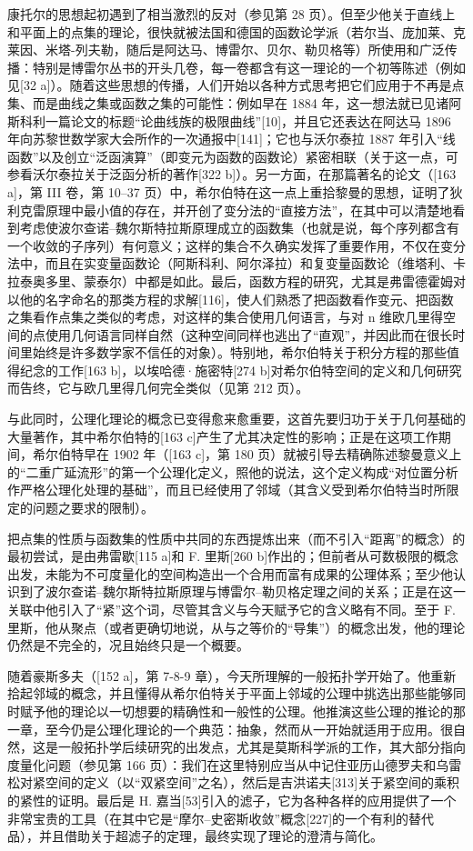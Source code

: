 康托尔的思想起初遇到了相当激烈的反对（参见第 28 页）。但至少他关于直线上和平面上的点集的理论，很快就被法国和德国的函数论学派（若尔当、庞加莱、克莱因、米塔-列夫勒，随后是阿达马、博雷尔、贝尔、勒贝格等）所使用和广泛传播：特别是博雷尔丛书的开头几卷，每一卷都含有这一理论的一个初等陈述（例如见{[}32 a{]}）。随着这些思想的传播，人们开始以各种方式思考把它们应用于不再是点集、而是曲线之集或函数之集的可能性：例如早在 1884 年，这一想法就已见诸阿斯科利一篇论文的标题“论曲线族的极限曲线”{[}10{]}，并且它还表达在阿达马 1896 年向苏黎世数学家大会所作的一次通报中{[}141{]}；它也与沃尔泰拉 1887 年引入“线函数”以及创立“泛函演算”（即变元为函数的函数论）紧密相联（关于这一点，可参看沃尔泰拉关于泛函分析的著作{[}322 b{]}）。另一方面，在那篇著名的论文（{[}163 a{]}，第 III 卷，第 10–37 页）中，希尔伯特在这一点上重拾黎曼的思想，证明了狄利克雷原理中最小值的存在，并开创了变分法的“直接方法”，在其中可以清楚地看到考虑使波尔查诺–魏尔斯特拉斯原理成立的函数集（也就是说，每个序列都含有一个收敛的子序列）有何意义；这样的集合不久确实发挥了重要作用，不仅在变分法中，而且在实变量函数论（阿斯科利、阿尔泽拉）和复变量函数论（维塔利、卡拉泰奥多里、蒙泰尔）中都是如此。最后，函数方程的研究，尤其是弗雷德霍姆对以他的名字命名的那类方程的求解{[}116{]}，使人们熟悉了把函数看作变元、把函数之集看作点集之类似的考虑，对这样的集合使用几何语言，与对 n 维欧几里得空间的点使用几何语言同样自然（这种空间同样也逃出了“直观”，并因此而在很长时间里始终是许多数学家不信任的对象）。特别地，希尔伯特关于积分方程的那些值得纪念的工作{[}163 b{]}，以埃哈德·施密特{[}274 b{]}对希尔伯特空间的定义和几何研究而告终，它与欧几里得几何完全类似（见第 212 页）。

与此同时，公理化理论的概念已变得愈来愈重要，这首先要归功于关于几何基础的大量著作，其中希尔伯特的{[}163 c{]}产生了尤其决定性的影响；正是在这项工作期间，希尔伯特早在 1902 年（{[}163 c{]}，第 180 页）就被引导去精确陈述黎曼意义上的“二重广延流形”的第一个公理化定义，照他的说法，这个定义构成“对位置分析作严格公理化处理的基础”，而且已经使用了邻域（其含义受到希尔伯特当时所限定的问题之要求的限制）。

把点集的性质与函数集的性质中共同的东西提炼出来（而不引入“距离”的概念）的最初尝试，是由弗雷歇{[}115 a{]}和 F. 里斯{[}260 b{]}作出的；但前者从可数极限的概念出发，未能为不可度量化的空间构造出一个合用而富有成果的公理体系；至少他认识到了波尔查诺–魏尔斯特拉斯原理与博雷尔–勒贝格定理之间的关系；正是在这一关联中他引入了“紧”这个词，尽管其含义与今天赋予它的含义略有不同。至于 F. 里斯，他从聚点（或者更确切地说，从与之等价的“导集”）的概念出发，他的理论仍然是不完全的，况且始终只是一个概要。

随着豪斯多夫（{[}152 a{]}，第 7-8-9 章），今天所理解的一般拓扑学开始了。他重新拾起邻域的概念，并且懂得从希尔伯特关于平面上邻域的公理中挑选出那些能够同时赋予他的理论以一切想要的精确性和一般性的公理。他推演这些公理的推论的那一章，至今仍是公理化理论的一个典范：抽象，然而从一开始就适用于应用。很自然，这是一般拓扑学后续研究的出发点，尤其是莫斯科学派的工作，其大部分指向度量化问题（参见第 166 页）：我们在这里特别应当从中记住亚历山德罗夫和乌雷松对紧空间的定义（以“双紧空间”之名），然后是吉洪诺夫{[}313{]}关于紧空间的乘积的紧性的证明。最后是 H. 嘉当{[}53{]}引入的滤子，它为各种各样的应用提供了一个非常宝贵的工具（在其中它是“摩尔–史密斯收敛”概念{[}227{]}的一个有利的替代品），并且借助关于超滤子的定理，最终实现了理论的澄清与简化。

